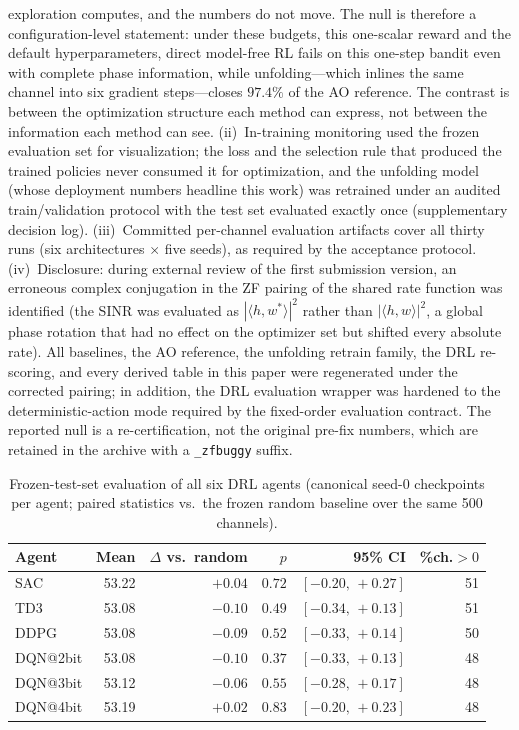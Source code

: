 exploration computes, and the numbers do not move. The null is therefore
a configuration-level statement: under these budgets, this one-scalar
reward and the default hyperparameters, direct
model-free RL fails on this one-step bandit even with complete phase
information, while unfolding---which inlines the same channel into six
gradient steps---closes $97.4\%$ of the AO reference. The contrast is
between the optimization structure each method can express, not between
the information each method can see.
(ii)~In-training monitoring used the frozen evaluation set for
visualization; the loss and the selection rule that produced the
trained policies never consumed it for optimization, and the unfolding
model (whose deployment numbers headline this work) was retrained
under an audited train/validation protocol with the test set evaluated
exactly once (supplementary decision log).
(iii)~Committed per-channel evaluation artifacts cover all thirty runs
(six architectures $\times$ five seeds), as required by the acceptance
protocol.
(iv)~Disclosure: during external review of the first submission
version, an erroneous complex conjugation in the ZF pairing of the
shared rate function was identified (the SINR was evaluated as
$|\langle h, w^{*}\rangle|^{2}$ rather than
$|\langle h, w\rangle|^{2}$, a global phase rotation that had no effect
on the optimizer set but shifted every absolute rate). All baselines,
the AO reference, the unfolding retrain family, the DRL re-scoring, and
every derived table in this paper were regenerated under the corrected
pairing; in addition, the DRL evaluation wrapper was hardened to the
deterministic-action mode required by the fixed-order evaluation
contract. The reported null is a re-certification, not the original
pre-fix numbers, which are retained in the archive with a
\texttt{\_zfbuggy} suffix.

\begin{table}[t]
\centering\small
\caption{Frozen-test-set evaluation of all six DRL agents
(canonical seed-0 checkpoints per agent; paired statistics vs.\ the frozen
random baseline over the same 500 channels).}
\label{tab:certified-drl}
\begin{tabular}{lrrrrr}
\toprule
Agent & Mean & $\Delta$ vs.\ random & $p$ & 95\% CI & \%ch.$>0$ \\
\midrule
SAC      & 53.22 & $+0.04$ & $0.72$ & $[-0.20,\,+0.27]$ & 51 \\
TD3      & 53.08 & $-0.10$ & $0.49$ & $[-0.34,\,+0.13]$ & 51 \\
DDPG     & 53.08 & $-0.09$ & $0.52$ & $[-0.33,\,+0.14]$ & 50 \\
DQN@2bit & 53.08 & $-0.10$ & $0.37$ & $[-0.33,\,+0.13]$ & 48 \\
DQN@3bit & 53.12 & $-0.06$ & $0.55$ & $[-0.28,\,+0.17]$ & 48 \\
DQN@4bit & 53.19 & $+0.02$ & $0.83$ & $[-0.20,\,+0.23]$ & 48 \\
\bottomrule
\end{tabular}
\end{table}

